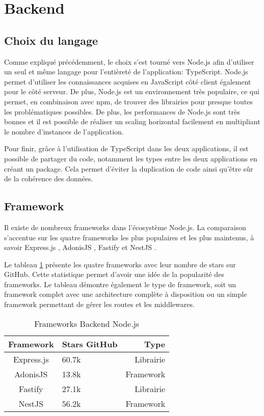 \section{Backend}

\subsection{Choix du langage}

Comme expliqué précédemment, le choix s'est tourné vers Node.js \cite{nodejs} afin d'utiliser un seul et même langage pour l'entièreté de l'application: TypeScript. Node.js permet d'utiliser les connaissances acquises en JavaScript côté client également pour le côté serveur. De plus, Node.js est un environnement très populaire, ce qui permet, en combinaison avec \Gls{npm}, de trouver des librairies pour presque toutes les problématiques possibles. De plus, les performances de Node.js sont très bonnes et il est possible de réaliser un scaling horizontal facilement en multipliant le nombre d'instances de l'application.

Pour finir, grâce à l'utilisation de TypeScript dans les deux applications, il est possible de partager du code, notamment les types entre les deux applications en créant un package. Cela permet d'éviter la duplication de code ainsi qu'être sûr de la cohérence des données.

\subsection{Framework}

Il existe de nombreux frameworks dans l'écosystème Node.js. La comparaison s'accentue sur les quatre frameworks les plus populaires et les plus maintenus, à savoir Express.js \cite{expressjs}, AdonisJS \cite{adonisjs}, Fastify \cite{fastify} et NestJS \cite{nestjs}.

Le tableau \ref{tab:frameworks-backend-nodejs} présente les quatre frameworks avec leur nombre de stars sur GitHub. Cette statistique permet d'avoir une idée de la popularité des frameworks. Le tableau démontre également le type de framework, soit un framework complet avec une architecture complète à disposition ou un simple framework permettant de gérer les routes et les middlewares.

\begin{table}[h]
  \begin{center}
    \caption{Frameworks Backend Node.js}
    \label{tab:frameworks-backend-nodejs}
    \begin{tabular}{c|l|r}
      Framework  & Stars GitHub & Type      \\ \hline
      Express.js & 60.7k        & Librairie \\
      AdonisJS   & 13.8k        & Framework \\
      Fastify    & 27.1k        & Librairie \\
      NestJS     & 56.2k        & Framework \\
    \end{tabular}
  \end{center}
\end{table}

